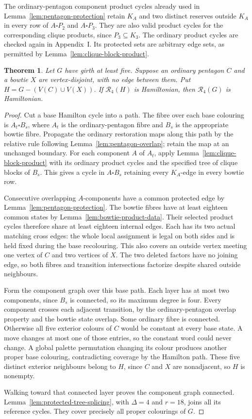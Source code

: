 \documentclass[11pt]{article}
\newtheorem{theorem}{Theorem}[section]
\theoremstyle{remark}
\newcommand{\R}{\mathcal R}
\numberwithin{equation}{section}
\numberwithin{table}{section}
\begin{document}
The ordinary-pentagon component product cycles already used in
Lemma~\ref{lem:pentagon-protection} retain $K_A$ and two distinct
reserves outside $K_A$ in every row of $A\square P_2$ and
$A\square P_3$. They are also valid product cycles for the corresponding
clique products, since $P_3\subseteq K_3$. The ordinary product cycles
are checked again in Appendix~I. Its protected sets are
arbitrary edge sets, as permitted by Lemma~\ref{lem:clique-block-product}.

\begin{theorem}\label{thm:pentagon-bowtie-restoration}
Let $G$ have girth at least five. Suppose an ordinary pentagon $C$
and a bowtie $X$ are vertex-disjoint, with no edge between them.
Put $H=G-(V(C)\cup V(X))$. If $\R_4(H)$ is Hamiltonian, then
$\R_4(G)$ is Hamiltonian.
\end{theorem}
\begin{proof}
Cut a base Hamilton cycle into a path. The fibre over each base
colouring is $A_t\square B_s$, where $A_t$ is the ordinary-pentagon
fibre and $B_s$ is the appropriate bowtie fibre. Propagate the ordinary
restoration maps along this path by the relative rule following
Lemma~\ref{lem:pentagon-overlap}; retain the map at an unchanged boundary.
For each component $A$ of $A_t$, apply
Lemma~\ref{lem:clique-block-product} with its ordinary product cycles and the
specified tree of clique blocks of $B_s$. This gives a cycle in $A\square B_s$
retaining every $K_A$-edge in every bowtie row.

Consecutive overlapping $A$-components have a common protected edge by
Lemma~\ref{lem:pentagon-protection}. The bowtie fibres have at least
eighteen common states by Lemma~\ref{lem:bowtie-product-data}. Their
selected product cycles therefore share at least eighteen internal edges.
Each has its two actual matching cross edges: the whole local assignment
is legal on both sides and is held fixed during the base recolouring.
This also covers an outside vertex meeting one vertex of $C$ and two
vertices of $X$. The two deleted factors have no joining edge, so both
fibres and transition intersections factorize despite shared outside
neighbours.

Form the component graph over this base path. Each layer has at most
two components, since $B_s$ is connected, so its maximum degree is four.
Every component crosses each adjacent transition, by the ordinary-pentagon
overlap property and the bowtie state overlap. Some ordinary fibre is
connected. Otherwise all five exterior colours of $C$ would be constant
at every base state. A move changes at most one of those entries, so
the constant word could never change. A global palette permutation
changing its colour produces another proper base colouring, contradicting
coverage by the Hamilton path. These five distinct exterior neighbours
belong to $H$, since $C$ and $X$ are nonadjacent, so $H$ is nonempty.

Walking toward that connected layer proves the component graph connected.
Lemma~\ref{lem:protected-tree-splicing}, with $\Delta=4$ and $r=18$,
joins all its reference cycles. They cover precisely all proper
colourings of $G$.
\end{proof}
\end{document}
